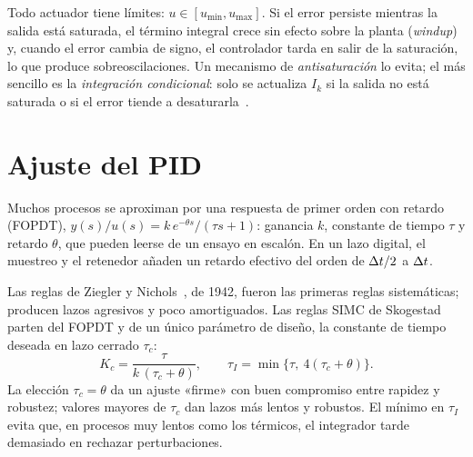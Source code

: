 \begin{definicion}\label{def:windup}
Todo actuador tiene límites: $u\in[u_{\min},u_{\max}]$. Si el error persiste mientras la salida está saturada, el término integral crece sin efecto sobre la planta (\emph{windup}) y, cuando el error cambia de signo, el controlador tarda en salir de la saturación, lo que produce sobreoscilaciones. Un mecanismo de \emph{antisaturación} lo evita; el más sencillo es la \emph{integración condicional}: solo se actualiza $I_k$ si la salida no está saturada o si el error tiende a desaturarla~\cite[cap.~11]{am}.
\end{definicion}

\section{Ajuste del PID}

\begin{definicion}\label{def:fopdt}
Muchos procesos se aproximan por una respuesta de primer orden con retardo (FOPDT), $y(s)/u(s)=k\,e^{-\theta s}/(\tau s+1)$: ganancia $k$, constante de tiempo $\tau$ y retardo $\theta$, que pueden leerse de un ensayo en escalón. En un lazo digital, el muestreo y el retenedor añaden un retardo efectivo del orden de $\Delta t/2$ a $\Delta t$.
\end{definicion}

Las reglas de Ziegler y Nichols~\cite{zn}, de 1942, fueron las primeras reglas sistemáticas; producen lazos agresivos y poco amortiguados. Las reglas SIMC de Skogestad~\cite{skogestad} parten del FOPDT y de un único parámetro de diseño, la constante de tiempo deseada en lazo cerrado $\tau_c$:
\begin{equation}\label{eq:simc}
K_c=\frac{\tau}{k\,(\tau_c+\theta)},\qquad \tau_I=\min\bigl\{\tau,\ 4(\tau_c+\theta)\bigr\}.
\end{equation}
La elección $\tau_c=\theta$ da un ajuste «firme» con buen compromiso entre rapidez y robustez; valores mayores de $\tau_c$ dan lazos más lentos y robustos. El mínimo en $\tau_I$ evita que, en procesos muy lentos como los térmicos, el integrador tarde demasiado en rechazar perturbaciones.

\addtocounter{definicion}{1}%

